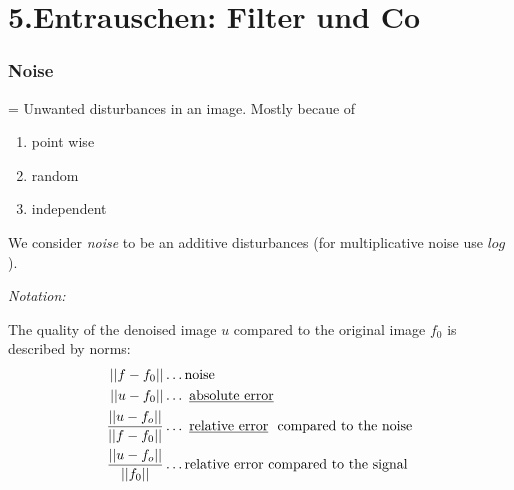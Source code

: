 \chapter{5.Entrauschen: Filter und Co}
    \subsection{Noise}
         = Unwanted disturbances in an image. Mostly becaue of 
        \begin{enumerate}[-]
            \item point wise
            \item random
            \item independent
        \end{enumerate}
				We consider \emph{noise} to be an additive disturbances (for multiplicative noise use $log$).

        \emph{Notation:}
        \begin{center}
        \end{center}

        The quality of the denoised image $u$ compared to the original image $f_0$ is described by norms:
        \[
				\begin{aligned}
								\norm{f-f_0} & \dots \text{noise}\\
				        \norm{u-f_0} & \dots \text{\mim{absolute error}}\\
				        \frac{\norm{u-f_o}}{\norm{f-f_0}} & \dots \text{\mim{relative error} compared to the noise}\\
				        \frac{\norm{u-f_o}}{\norm{f_0}} & \dots \text{relative error compared to the signal}
				\end{aligned}
				\]
        
